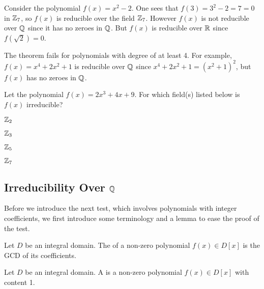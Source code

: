 \begin{example}
    Consider the polynomial $f(x) = x^2 - 2$. One sees that $f(3) = 3^2 - 2 = 7 = 0$ in $\mathbb{Z}_7$, so $f(x)$ is reducible over the field $\mathbb{Z}_7$. However $f(x)$ is not reducible over $\mathbb{Q}$ since it has no zeroes in $\mathbb{Q}$. But $f(x)$ is reducible over $\mathbb{R}$ since $f(\sqrt2) = 0$.
\end{example}

\begin{example}
    The theorem fails for polynomials with degree of at least 4. For example, $f(x) = x^4 + 2x^2 + 1$ is reducible over $\mathbb{Q}$ since $x^4 + 2x^2 + 1 = (x^2+1)^2$, but $f(x)$ has no zeroes in $\mathbb{Q}$.
\end{example}

\begin{exercise}
    Let the polynomial $f(x) = 2x^3 + 4x + 9$. For which field(s) listed below is $f(x)$ irreducible?
    \begin{multicols}{4}
        \begin{partquestions}{\alph*}
            \item $\mathbb{Z}_2$
            \item $\mathbb{Z}_3$
            \item $\mathbb{Z}_5$
            \item $\mathbb{Z}_7$
        \end{partquestions}
    \end{multicols}
\end{exercise}

\subsection{Irreducibility Over $\mathbb{Q}$}
Before we introduce the next test, which involves polynomials with integer coefficients, we first introduce some terminology and a lemma to ease the proof of the test.

\begin{definition}
    Let $D$ be an integral domain. The  of a non-zero polynomial $f(x) \in D[x]$ is the GCD of its coefficients.
\end{definition}

\begin{definition}
    Let $D$ be an integral domain. A  is a non-zero polynomial $f(x) \in D[x]$ with content 1.
\end{definition}

